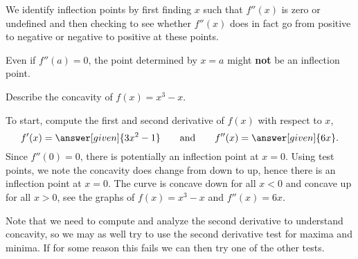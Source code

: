\documentclass{ximera}
\begin{document}
We identify inflection points by first finding $x$ such that $f''(x)$
is zero or undefined and then checking to see whether $f''(x)$ does in
fact go from positive to negative or negative to positive at these
points.

\begin{warning}
Even if $f''(a) = 0$, the point determined by $x=a$ might \textbf{not}
be an inflection point.
\end{warning}


\begin{example}
Describe the concavity of $f(x)=x^3-x$. 

\begin{explanation}
To start, compute the first and second derivative of $f(x)$ with
respect to $x$,
\[
f'(x)=\answer[given]{3x^2-1}\qquad\text{and}\qquad f''(x)=\answer[given]{6x}.
\]
Since $f''(0)=0$, there is potentially an inflection point at
$x=0$. Using test points, we note the concavity does change from down
to up, hence there is an inflection point at $x=0$. The curve is
concave down for all $x<0$ and concave up for all $x>0$, see the
graphs of $f(x) = x^3-x$ and $f''(x) = 6x$.
\begin{image}
\end{image}
\end{explanation}
\end{example}


Note that we need to compute and analyze the second derivative to
understand concavity, so we may as well try to use the second
derivative test for maxima and minima. If for some reason this fails
we can then try one of the other tests.
\end{document}
